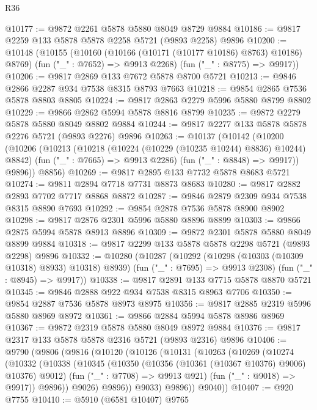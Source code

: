 \begin{lexlean}{R36}
\begin{coremodule}
@10177 := @9872 @2261 @5878 @5880 @8049 @8729 @9884
@10186 := @9817 @2259 @133 @5878 @5878 @2258 @5721 (@9893 @2258) @9896
@10200 := @10148
    (@10155
      (@10160 (@10166 (@10171 (@10177 @10186) @8763) @10186) @8769)
      (fun ("_" : @7652) => @9913 @2268)
      (fun ("_" : @8775) => @9917))
@10206 := @9817 @2869 @133 @7672 @5878 @8700 @5721
@10213 := @9846 @2866 @2287 @934 @7538 @8315 @8793 @7663
@10218 := @9854 @2865 @7536 @5878 @8803 @8805
@10224 := @9817 @2863 @2279 @5996 @5880 @8799 @8802
@10229 := @9866 @2862 @5994 @5878 @8816 @8799
@10235 := @9872 @2279 @5878 @5880 @8049 @8802 @9884
@10244 := @9817 @2277 @133 @5878 @5878 @2276 @5721 (@9893 @2276) @9896
@10263 := @10137
    (@10142
      (@10200
        (@10206
          (@10213
            (@10218 (@10224 (@10229 (@10235 @10244) @8836) @10244) @8842)
            (fun ("_" : @7665) => @9913 @2286)
            (fun ("_" : @8848) => @9917))
          @9896))
      @8856)
@10269 := @9817 @2895 @133 @7732 @5878 @8683 @5721
@10274 := @9811 @2894 @7718 @7731 @8873 @8683
@10280 := @9817 @2882 @2893 @7702 @7717 @8868 @8872
@10287 := @9846 @2879 @2309 @934 @7538 @8315 @8890 @7693
@10292 := @9854 @2878 @7536 @5878 @8900 @8902
@10298 := @9817 @2876 @2301 @5996 @5880 @8896 @8899
@10303 := @9866 @2875 @5994 @5878 @8913 @8896
@10309 := @9872 @2301 @5878 @5880 @8049 @8899 @9884
@10318 := @9817 @2299 @133 @5878 @5878 @2298 @5721 (@9893 @2298) @9896
@10332 := @10280
    (@10287
      (@10292 (@10298 (@10303 (@10309 @10318) @8933) @10318) @8939)
      (fun ("_" : @7695) => @9913 @2308)
      (fun ("_" : @8945) => @9917))
@10338 := @9817 @2891 @133 @7715 @5878 @8870 @5721
@10345 := @9846 @2888 @922 @934 @7538 @8315 @8963 @7706
@10350 := @9854 @2887 @7536 @5878 @8973 @8975
@10356 := @9817 @2885 @2319 @5996 @5880 @8969 @8972
@10361 := @9866 @2884 @5994 @5878 @8986 @8969
@10367 := @9872 @2319 @5878 @5880 @8049 @8972 @9884
@10376 := @9817 @2317 @133 @5878 @5878 @2316 @5721 (@9893 @2316) @9896
@10406 := @9790
    (@9806
      (@9816
        (@10120
          (@10126
            (@10131
              (@10263
                (@10269
                  (@10274
                    (@10332
                      (@10338
                        (@10345
                          (@10350 (@10356 (@10361 (@10367 @10376) @9006) @10376) @9012)
                          (fun ("_" : @7708) => @9913 @921)
                          (fun ("_" : @9018) => @9917))
                        @9896))
                    @9026)
                  @9896))
              @9033)
            @9896))
        @9040))
@10407 := @920 @7755
@10410 := @5910 (@6581 @10407) @9765

\end{coremodule}
\end{lexlean}
